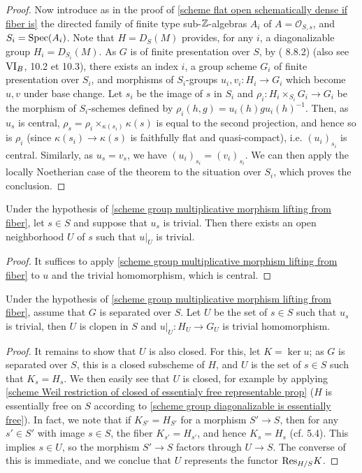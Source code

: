 \begin{proof}
Now introduce as in the proof of \cref{scheme flat open schematically dense if fiber is} the directed family of finite type sub-$\mathbb{Z}$-algebras $A_i$ of $A=\mathscr{O}_{S,s}$, and $S_i=\mathrm{Spec}(A_i)$. Note that $H=D_S(M)$ provides, for any $i$, a diagonalizable group $H_i=D_{S_i}(M)$. As $G$ is of finite presentation over $S$, by (\cite{EGA4-3} 8.8.2) (also see \cite{SGA3-1} $\Rmnum{6}_B$, 10.2 et 10.3), there exists an index $i$, a group scheme $G_i$ of finite presentation over $S_i$, and morphisms of $S_i$-groups $u_i,v_i:H_i\to G_i$ which become $u,v$ under base change. Let $s_i$ be the image of $s$ in $S_i$ and $\rho_i:H_i\times_{S_i}G_i\to G_i$ be the morphism of $S_i$-schemes defined by $\rho_i(h,g)=u_i(h)gu_i(h)^{-1}$. Then, as $u_s$ is central, $\rho_s=\rho_i\times_{\kappa(s_i)}\kappa(s)$ is equal to the second projection, and hence so is $\rho_i$ (since $\kappa(s_i)\to\kappa(s)$ is faithfully flat and quasi-compact), i.e. $(u_i)_{s_i}$ is central. Similarly, as $u_s=v_s$, we have $(u_i)_{s_i}=(v_i)_{s_i}$. We can then apply the locally Noetherian case of the theorem to the situation over $S_i$, which proves the conclusion.  
\end{proof}

\begin{corollary}\label{scheme group multiplicative morphism trivial on fiber lifting}
Under the hypothesis of \cref{scheme group multiplicative morphism lifting from fiber}, let $s\in S$ and suppose that $u_s$ is trivial. Then there exists an open neighborhood $U$ of $s$ such that $u|_U$ is trivial.
\end{corollary}
\begin{proof}
It suffices to apply \cref{scheme group multiplicative morphism lifting from fiber} to $u$ and the trivial homomorphism, which is central.
\end{proof}

\begin{corollary}\label{scheme group multiplicative morphism trivial locus prop}
Under the hypothesis of \cref{scheme group multiplicative morphism lifting from fiber}, assume that $G$ is separated over $S$. Let $U$ be the set of $s\in S$ such that $u_s$ is trivial, then $U$ is clopen in $S$ and $u|_U:H_U\to G_U$ is trivial homomorphism.
\end{corollary}
\begin{proof}
It remains to show that $U$ is also closed. For this, let $K=\ker u$; as $G$ is separated over $S$, this is a closed subscheme of $H$, and $U$ is the set of $s\in S$ such that $K_s=H_s$. We then easily see that $U$ is closed, for example by applying \cref{scheme Weil restriction of closed of essentialy free representable prop} ($H$ is essentially free on $S$ according to \cref{scheme group diagonalizable is essentially free}). In fact, we note that if $K_{S'}=H_{S'}$ for a morphism $S'\to S$, then for any $s'\in S'$ with image $s\in S$, the fiber $K_{s'}=H_{s'}$, and hence $K_s=H_s$ (cf. \cite{SGA1}  5.4). This implies $s\in U$, so the morphism $S'\to S$ factors through $U\to S$. The converse of this is immediate, and we conclue that $U$ represents the functor $\mathrm{Res}_{H/S}K$.
\end{proof}

